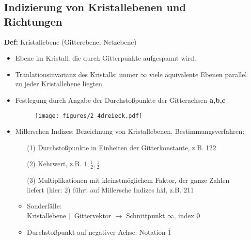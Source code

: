 \subsection{Indizierung von Kristallebenen und Richtungen}
\label{kap:2_4}
\textbf{Def:} Kristallebene (Gitterebene, Netzebene)
\begin{itemize}
    \item Ebene im Kristall, die durch Gitterpunkte aufgespannt wird.
    \item Tranlationsinvarianz des Kristalls: immer $\infty$ viele äquivalente Ebenen parallel zu jeder Kristallebene liegten.
    \item Festlegung durch Angabe der Durchstoßpunkte der Gitterachsen \textbf{a,b,c}
    \begin{figure}[H]
        \centering
        \texttt{[image: figures/2\_4dreieck.pdf]}
        \caption{}
        \label{}
    \end{figure}
    \item Millerschen Indizes: Bezeichnung von Kristallebenen. Bestimmungsverfahren:
    \begin{itemize}
        \item[(1)] Durchstoßpunkte in Einheiten der Gitterkonstante, z.B. 122
        \item[(2)] Kehrwert, z.B. $1, \frac{1}{2}, \frac{1}{2}$
        \item[(3)] Multiplikationen mit kleinstmöglichem Faktor, der ganze Zahlen liefert (hier: 2) führt auf Millersche Indizes hkl, z.B. 211
    \end{itemize}
    \begin{itemize}
        \item Sonderfälle:\\
        Kristallebene || Gittervektor $\rightarrow$ Schnittpunkt $\infty$, index 0
        \item Durchstoßpunkt auf negativer Achse: Notation $\overline{1}$
    \end{itemize}

\end{itemize}
